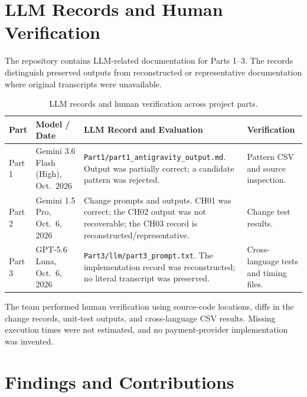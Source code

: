 \documentclass[11pt,a4paper]{article}
\renewcommand{\arraystretch}{1.15}
\begin{document}
\section{LLM Records and Human Verification}

The repository contains LLM-related documentation for Parts 1--3. The records distinguish preserved outputs from reconstructed or representative documentation where original transcripts were unavailable.

\begin{table}[htbp]
\centering
\small
\renewcommand{\arraystretch}{1.3}
\begin{tabularx}{\textwidth}{@{}p{}p{}X p{}@{}}
\toprule
\textbf{Part} & \textbf{Model / Date} & \textbf{LLM Record and Evaluation} & \textbf{Verification} \\
\midrule
Part 1 &
Gemini 3.6 Flash (High), Oct.\ 2026 &
\texttt{Part1/part1\_antigravity\_output.md}. Output was partially correct; a candidate pattern was rejected. &
Pattern CSV and source inspection. \\
\midrule
Part 2 &
Gemini 1.5 Pro, Oct.\ 6, 2026 &
Change prompts and outputs. CH01 was correct; the CH02 output was not recoverable; the CH03 record is reconstructed/representative. &
Change test results. \\
\midrule
Part 3 &
GPT-5.6 Luna, Oct.\ 6, 2026 &
\texttt{Part3/llm/part3\_prompt.txt}. The implementation record was reconstructed; no literal transcript was preserved. &
Cross-language tests and timing files. \\
\bottomrule
\end{tabularx}
\caption{LLM records and human verification across project parts.}
\label{tab:llm-verification}
\end{table}

The team performed human verification using source-code locations, diffs in the change records, unit-test outputs, and cross-language CSV results. Missing execution times were not estimated, and no payment-provider implementation was invented.

\section{Findings and Contributions}
\end{document}
